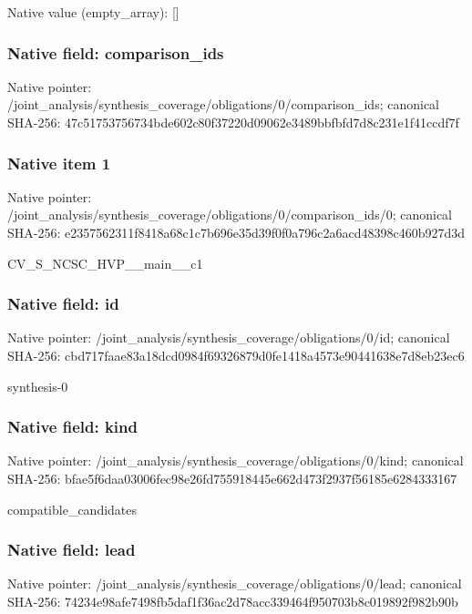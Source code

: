 \documentclass[10pt,a4paper]{article}
\begin{document}
Native value (empty\_\allowbreak{}array): []

\subsubsection{Native field: comparison\_\allowbreak{}ids}
Native pointer: /joint\_\allowbreak{}analysis/synthesis\_\allowbreak{}coverage/obligations/0/comparison\_\allowbreak{}ids; canonical SHA-256: 47c51753756734bde602c80f37220d09062e3489bbfbfd7d8c231e1f41ccdf7f

\subsubsection{Native item 1}
Native pointer: /joint\_\allowbreak{}analysis/synthesis\_\allowbreak{}coverage/obligations/0/comparison\_\allowbreak{}ids/0; canonical SHA-256: e2357562311f8418a68c1c7b696e35d39f0f0a796c2a6acd48398c460b927d3d

\begingroup\raggedright\sloppy CV\_\allowbreak{}S\_\allowbreak{}NCSC\_\allowbreak{}HVP\_\allowbreak{}\_\allowbreak{}main\_\allowbreak{}\_\allowbreak{}c1\par\endgroup

\subsubsection{Native field: id}
Native pointer: /joint\_\allowbreak{}analysis/synthesis\_\allowbreak{}coverage/obligations/0/id; canonical SHA-256: cbd717faae83a18dcd0984f69326879d0fe1418a4573e90441638e7d8eb23ec6

\begingroup\raggedright\sloppy synthesis-0\par\endgroup

\subsubsection{Native field: kind}
Native pointer: /joint\_\allowbreak{}analysis/synthesis\_\allowbreak{}coverage/obligations/0/kind; canonical SHA-256: bfae5f6daa03006fec98e26fd755918445e662d473f2937f56185e6284333167

\begingroup\raggedright\sloppy compatible\_\allowbreak{}candidates\par\endgroup

\subsubsection{Native field: lead}
Native pointer: /joint\_\allowbreak{}analysis/synthesis\_\allowbreak{}coverage/obligations/0/lead; canonical SHA-256: 74234e98afe7498fb5daf1f36ac2d78acc339464f950703b8c019892f982b90b
\end{document}

